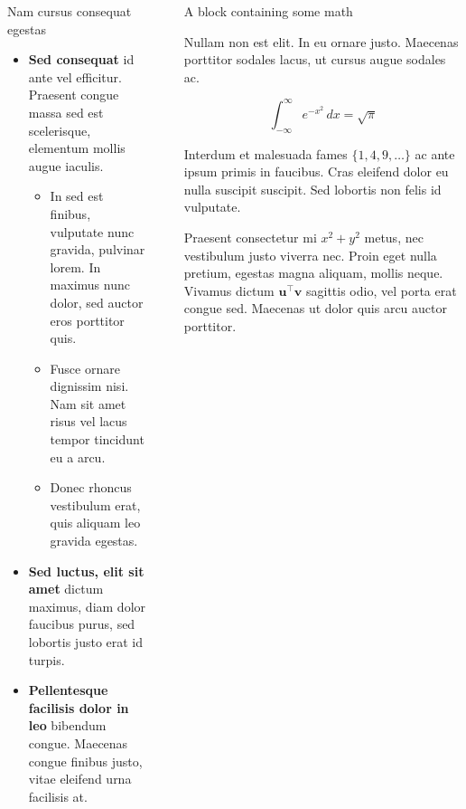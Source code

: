 \documentclass[final]{beamer}
\newlength{\sepwidth}
\newlength{\colwidth}
\newcommand{\separatorcolumn}{\begin{column}{\sepwidth}\end{column}}
\begin{document}
\begin{frame}[t]
\begin{columns}[t]
\begin{column}{\colwidth}
\begin{block}{Nam cursus consequat egestas}
    \begin{itemize}
      \item \textbf{Sed consequat} id ante vel efficitur. Praesent congue massa
        sed est scelerisque, elementum mollis augue iaculis.
        \begin{itemize}
          \item In sed est finibus, vulputate
            nunc gravida, pulvinar lorem. In maximus nunc dolor, sed auctor eros
            porttitor quis.
          \item Fusce ornare dignissim nisi. Nam sit amet risus vel lacus
            tempor tincidunt eu a arcu.
          \item Donec rhoncus vestibulum erat, quis aliquam leo
            gravida egestas.
        \end{itemize}
      \item \textbf{Sed luctus, elit sit amet} dictum maximus, diam dolor
        faucibus purus, sed lobortis justo erat id turpis.
      \item \textbf{Pellentesque facilisis dolor in leo} bibendum congue.
        Maecenas congue finibus justo, vitae eleifend urna facilisis at.
    \end{itemize}

  \end{block}

\end{column}

\separatorcolumn

\begin{column}{\colwidth}

  \begin{block}{A block containing some math}

    Nullam non est elit. In eu ornare justo. Maecenas porttitor sodales lacus,
    ut cursus augue sodales ac.

    $$
    \int_{-\infty}^{\infty} e^{-x^2}\,dx = \sqrt{\pi}
    $$

    Interdum et malesuada fames $\{1, 4, 9, \ldots\}$ ac ante ipsum primis in
    faucibus. Cras eleifend dolor eu nulla suscipit suscipit. Sed lobortis non
    felis id vulputate.


    Praesent consectetur mi $x^2 + y^2$ metus, nec vestibulum justo viverra
    nec. Proin eget nulla pretium, egestas magna aliquam, mollis neque. Vivamus
    dictum $\mathbf{u}^\intercal\mathbf{v}$ sagittis odio, vel porta erat
    congue sed. Maecenas ut dolor quis arcu auctor porttitor.


\end{block}
\end{column}
\end{columns}
\end{frame}
\end{document}
